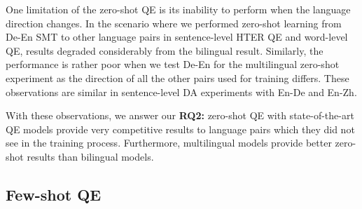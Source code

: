 One limitation of the zero-shot QE is its inability to perform when the language direction changes. In the scenario where we performed zero-shot learning from De-En SMT to other language pairs in sentence-level HTER QE and word-level QE, results degraded considerably from the bilingual result. Similarly, the performance is rather poor when we test De-En for the multilingual zero-shot experiment as the direction of all the other pairs used for training differs. These observations are similar in sentence-level DA experiments with En-De and En-Zh.

With these observations, we answer our \textbf{RQ2:} zero-shot QE with state-of-the-art QE models provide very competitive results to language pairs which they did not see in the training process. Furthermore, multilingual models provide better zero-shot results than bilingual models.

\subsection{Few-shot QE}
\label{sec:multilingual_fewshot}


